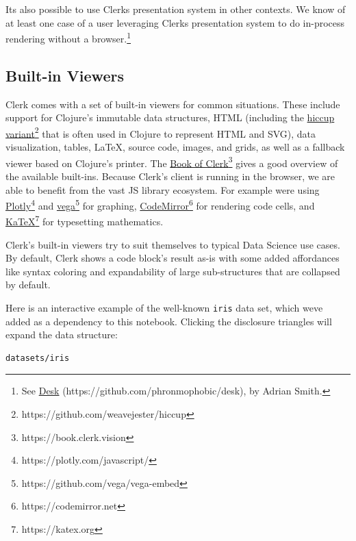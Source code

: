 \documentclass[sigconf,screen]{acmart}
\newcommand{\passthrough}[1]{#1}
\begin{document}
It\textquotesingle s also possible to use Clerk\textquotesingle s presentation system in other contexts. We know of at least one case of a user leveraging Clerk\textquotesingle s presentation system to do in-process rendering without a browser.\footnote{See {\href{https://github.com/phronmophobic/desk}{Desk} (https://github.com/phronmophobic/desk)}, by Adrian Smith.}

\hypertarget{built-in-viewers}{%
\subsection{Built-in Viewers}\label{built-in-viewers}}

Clerk comes with a set of built-in viewers for common situations. These include support for Clojure's immutable data structures, HTML (including the {\href{https://github.com/weavejester/hiccup}{hiccup variant}\footnote{https://github.com/weavejester/hiccup}} that is often used in Clojure to represent HTML and SVG), data visualization, tables, LaTeX, source code, images, and grids, as well as a fallback viewer based on Clojure's printer. The {\href{https://book.clerk.vision}{Book of Clerk}\footnote{https://book.clerk.vision}} gives a good overview of the available built-ins. Because Clerk's client is running in the browser, we are able to benefit from the vast JS library ecosystem. For example we\textquotesingle re using {\href{https://plotly.com/javascript/}{Plotly}\footnote{https://plotly.com/javascript/}} and {\href{https://github.com/vega/vega-embed}{vega}\footnote{https://github.com/vega/vega-embed}} for graphing, {\href{https://codemirror.net}{CodeMirror}\footnote{https://codemirror.net}} for rendering code cells, and {\href{https://katex.org}{KaTeX}\footnote{https://katex.org}} for typesetting mathematics.

Clerk's built-in viewers try to suit themselves to typical Data Science use cases. By default, Clerk shows a code block's result as-is with some added affordances like syntax coloring and expandability of large sub-structures that are collapsed by default.

Here is an interactive example of the well-known \passthrough{\lstinline!iris!} data set, which we\textquotesingle ve added as a dependency to this notebook. Clicking the disclosure triangles will expand the data structure:

\begin{minipage}{\linewidth}
\begin{lstlisting}
datasets/iris
\end{lstlisting}
\end{minipage}
\end{document}
